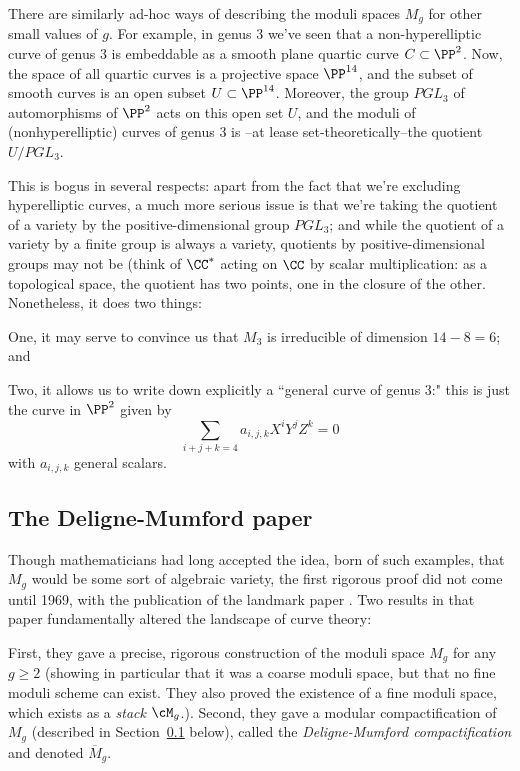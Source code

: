 There are similarly ad-hoc ways of describing the moduli spaces $M_g$ for other small values of $g$. For example, in genus 3 we've seen that a non-hyperelliptic curve of genus 3 is embeddable as a smooth plane quartic curve $C \subset \PP^2$. Now, the space of all quartic curves is a projective space $\PP^{14}$, and the subset of smooth curves is an open subset $U \subset \PP^{14}$. Moreover, the group $PGL_3$ of automorphisms of $\PP^2$ acts on this open set $U$, and  the moduli of (nonhyperelliptic) curves of genus 3 is --at lease set-theoretically--the quotient $U/PGL_3$.

This is bogus in several respects: apart from the fact that we're excluding hyperelliptic curves, a much more serious issue is that we're taking the quotient of a variety by the positive-dimensional group $PGL_3$; and while the quotient of a variety by a finite group is always a variety, quotients by positive-dimensional groups may not be (think of $\CC^*$ acting on $\CC$ by scalar multiplication: as a topological space, the quotient has two points, one in the closure of the other.  Nonetheless, it does two things:

One, it may serve to convince us that $M_3$ is irreducible of dimension $14-8 = 6$; and

Two, it allows us to write down explicitly a ``general curve of genus 3:" this is just the curve in $\PP^2$ given by
$$
\sum_{i+j+k = 4} a_{i,j,k} X^iY^jZ^k = 0
$$
with $a_{i,j,k}$ general scalars.

\subsection{The Deligne-Mumford paper}

Though mathematicians had long accepted the idea, born of such examples, that $M_g$ would be some sort of algebraic variety, the first rigorous proof did not come until 1969, with the publication of the landmark paper \cite{Deligne-Mumford}. Two results in that paper fundamentally altered the landscape of curve theory:

First, they gave a precise, rigorous construction of the moduli space $M_g$ for any $g \geq 2$ (showing in particular that it was a coarse moduli space, but that no fine moduli scheme can exist. They also proved the existence of a fine moduli space, which exists as a \emph{ stack} $\cM_g$.). Second, they gave a modular compactification of $M_g$ (described in Section~\ref{} below), called the \emph{Deligne-Mumford compactification} and denoted $\overline M_g$. 

